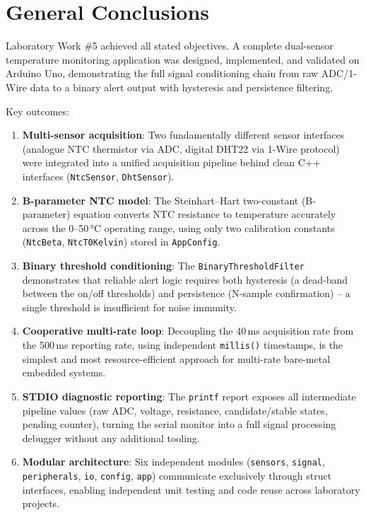 \documentclass[12pt]{article}
\begin{document}
\section*{General Conclusions}
\hspace{0.8cm} Laboratory Work \#5 achieved all stated objectives. A complete dual-sensor temperature monitoring application was designed, implemented, and validated on Arduino Uno, demonstrating the full signal conditioning chain from raw ADC/1-Wire data to a binary alert output with hysteresis and persistence filtering.

Key outcomes:
\begin{enumerate}
    \item \textbf{Multi-sensor acquisition}: Two fundamentally different sensor interfaces (analogue NTC thermistor via ADC, digital DHT22 via 1-Wire protocol) were integrated into a unified acquisition pipeline behind clean C++ interfaces (\texttt{NtcSensor}, \texttt{DhtSensor}).
    \item \textbf{B-parameter NTC model}: The Steinhart--Hart two-constant (B-parameter) equation converts NTC resistance to temperature accurately across the 0--50\,°C operating range, using only two calibration constants (\texttt{NtcBeta}, \texttt{NtcT0Kelvin}) stored in \texttt{AppConfig}.
    \item \textbf{Binary threshold conditioning}: The \texttt{BinaryThresholdFilter} demonstrates that reliable alert logic requires both hysteresis (a dead-band between the on/off thresholds) and persistence (N-sample confirmation) -- a single threshold is insufficient for noise immunity.
    \item \textbf{Cooperative multi-rate loop}: Decoupling the 40\,ms acquisition rate from the 500\,ms reporting rate, using independent \texttt{millis()} timestamps, is the simplest and most resource-efficient approach for multi-rate bare-metal embedded systems.
    \item \textbf{STDIO diagnostic reporting}: The \texttt{printf} report exposes all intermediate pipeline values (raw ADC, voltage, resistance, candidate/stable states, pending counter), turning the serial monitor into a full signal processing debugger without any additional tooling.
    \item \textbf{Modular architecture}: Six independent modules (\texttt{sensors}, \texttt{signal}, \texttt{peripherals}, \texttt{io}, \texttt{config}, \texttt{app}) communicate exclusively through struct interfaces, enabling independent unit testing and code reuse across laboratory projects.
\end{enumerate}
\end{document}
